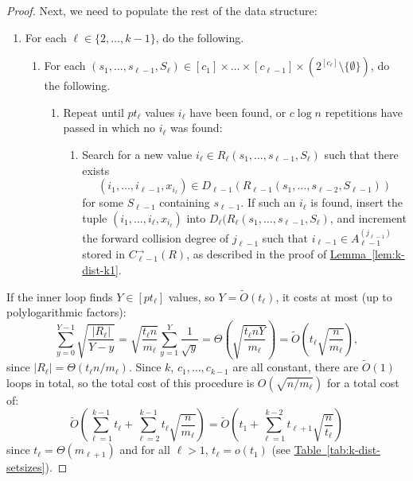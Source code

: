 \documentclass{article}
\newcommand{\lem}[1]{\hyperref[lem:#1]{Lemma~\ref*{lem:#1}}}
\newcommand{\tabl}[1]{\hyperref[tab:#1]{Table~\ref*{tab:#1}}}
\renewcommand{\>}{\rangle}
\newcommand{\<}{\langle}
\renewcommand{\(}{\left(}
\renewcommand{\)}{\right)}
\begin{document}
\begin{proof}
\noindent Next, we need to populate the rest of the data structure:
\begin{enumerate}
	\item[] For each $\ell\in\{2,\dots,k-1\}$, do the following. 
	\begin{enumerate}
		\item[] For each $(s_1,\dots,s_{\ell-1},S_{\ell})\in [c_1]\times\dots\times[c_{\ell-1}]\times (2^{[c_{\ell}]}\setminus\{\emptyset\})$, do the following. 
		\begin{enumerate}
			\item[] Repeat until $p t_{\ell}$ values $i_{\ell}$ have been found, or $c\log n$ repetitions have passed in which no $i_{\ell}$ was found:
			\begin{enumerate}
				\item[] Search for a new value $i_{\ell}\in R_{\ell}(s_1,\dots,s_{\ell-1},S_{\ell})$ such that there exists 
$$(i_1,\dots,i_{\ell-1},x_{i_{\ell}})\in D_{\ell-1}(R_{\ell-1}(s_1,\dots,s_{\ell-2},S_{\ell-1}))$$
 for some $S_{\ell-1}$ containing $s_{\ell-1}$.  If such an $i_{\ell}$ is found, insert the tuple $(i_1,\dots,i_{\ell},x_{i_{\ell}})$ into $D_{\ell}(R_{\ell}(s_1,\dots,s_{\ell-1},S_{\ell})$, and increment the forward collision degree of $j_{\ell-1}$ such that $i_{\ell-1}\in A_{\ell-1}^{(j_{\ell-1})}$ stored in $C^{\rightarrow}_{\ell-1}(R)$, as described in the proof of \lem{k-dist-k1}.
			\end{enumerate}
		\end{enumerate}
	\end{enumerate}
\end{enumerate}
If the inner loop finds $Y\in [pt_{\ell}]$ values, so $Y=\widetilde{O}(t_{\ell})$, it costs at most (up to polylogarithmic factors):
$$\sum_{y=0}^{Y-1}\sqrt{\frac{|R_{\ell}|}{Y-y}} = \sqrt{\frac{t_{\ell}n}{m_{\ell}}}\sum_{y=1}^Y\frac{1}{\sqrt{y}} = \Theta\left(\sqrt{\frac{t_{\ell}n Y}{m_{\ell}}}\right)
=\widetilde{O}\left(t_{\ell}\sqrt{\frac{n }{m_{\ell}}}\right),$$
since $|R_{\ell}|=\Theta(t_{\ell}n/m_{\ell})$.
Since $k$, $c_1,\dots,c_{k-1}$ are all constant, there are $\widetilde{O}(1)$ loops in total, so the total cost of this procedure is
$O(\sqrt{n/m_{\ell}})$
for a total cost of:
$$\widetilde{O}\left(\sum_{\ell=1}^{k-1}t_{\ell}+\sum_{\ell=2}^{k-1}t_{\ell}\sqrt{\frac{n}{m_{\ell}}}\right)=\widetilde{O}\left(t_1+\sum_{\ell=1}^{k-2}t_{\ell+1}\sqrt{\frac{n}{t_{\ell}}}\right)$$
since $t_{\ell}=\Theta(m_{\ell+1})$ and for all $\ell>1$, $t_{\ell}=o(t_1)$ (see \tabl{k-dist-setsizes}).


\end{proof}
\end{document}
